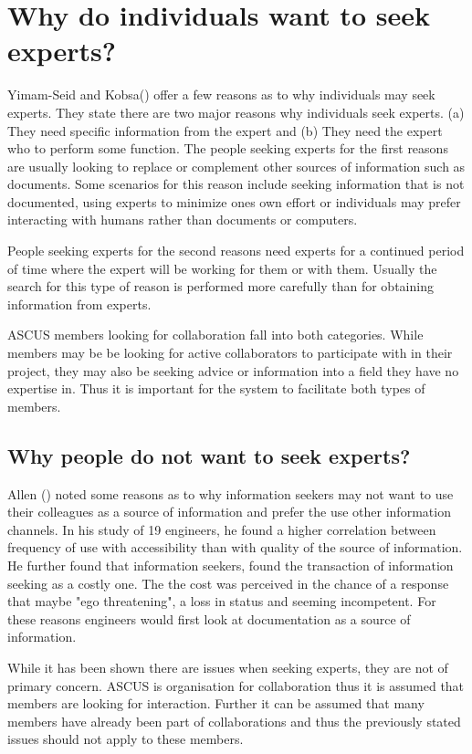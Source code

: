 \documentclass[a4paper,oneside,11pt]{report}
\begin{document}
\section{Why do individuals want to seek experts?}
Yimam-Seid and Kobsa(\citeyear{kobsaseid2003}) offer a few reasons as to why individuals may seek experts. They state there are two major reasons why individuals seek experts. (a) They need specific information from the expert and (b) They need the expert who to perform some function. The people seeking experts for the first reasons are usually looking to replace or complement other sources of information such as documents. Some scenarios for this reason include seeking information that is not documented, using experts to minimize ones own effort or individuals may prefer interacting with humans rather than documents or computers. 

People seeking experts for the second reasons need experts for a continued period of time where the expert will be working for them or with them. Usually the search for this type of reason is performed more carefully than for obtaining information from experts.

ASCUS members looking for collaboration fall into both categories. While members may be be looking for active collaborators to participate with in their project, they may also be seeking advice or information into a field they have no expertise in. Thus it is important for the system to facilitate both types of members.

\subsection{Why people do not want to seek experts?}
Allen (\citeyear{allen1977}) noted some reasons as to why information seekers may not want to use their colleagues as a source of information and prefer the use other information channels. In his study of 19 engineers, he found a higher correlation between frequency of use with accessibility than with quality of the source of information. He further found that information seekers, found the transaction of information seeking as a costly one. The the cost was perceived in the chance of a response that maybe "ego threatening", a loss in status and seeming incompetent. For these reasons engineers would first look at documentation as a source of information. 

While it has been shown there are issues when seeking experts, they are not of primary concern. ASCUS is organisation for collaboration thus it is assumed that members are looking for interaction. Further it can be assumed that many members have already been part of collaborations and thus the previously stated issues should not apply to these members.
\end{document}
